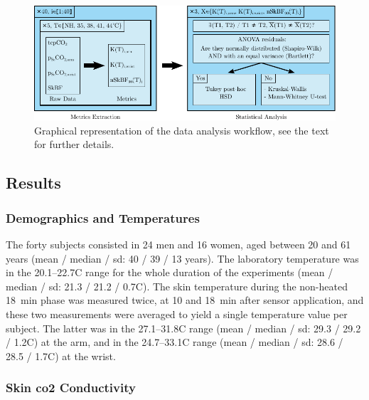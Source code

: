 \begin{figure}
	\centering
	\includegraphics{1_main_matter/tcco2_figures/data_analysis.pdf}
	\caption[Graphical representation of the data analysis workflow.]{Graphical representation of the data analysis workflow, see the text for further details.}\label{fig:tcco2:data_analysis}
\end{figure}

\subsection{Results}\label{sect:tcco2:results}

\subsubsection{Demographics and Temperatures}

The forty subjects consisted in 24 men and 16 women, aged between 20 and 61 years (mean / median / \gls{sd}: 40 / 39 / 13 years). The laboratory temperature was in the 20.1--22.7{\degree}C range for the whole duration of the experiments (mean / median / \gls{sd}: 21.3 / 21.2 / 0.7{\degree}C). The skin temperature during the non-heated 18~min phase was measured twice, at 10 and 18~min after sensor application, and these two measurements were averaged to yield a single temperature value per subject. The latter was in the 27.1--31.8{\degree}C range (mean / median / \gls{sd}: 29.3 / 29.2 / 1.2{\degree}C) at the arm, and in the 24.7--33.1{\degree}C range (mean / median / \gls{sd}: 28.6 / 28.5 / 1.7{\degree}C) at the wrist.

\subsubsection{Skin \texorpdfstring{\gls{co2}}{CO2} Conductivity}\label{subsect:tcco2:results:ks}

